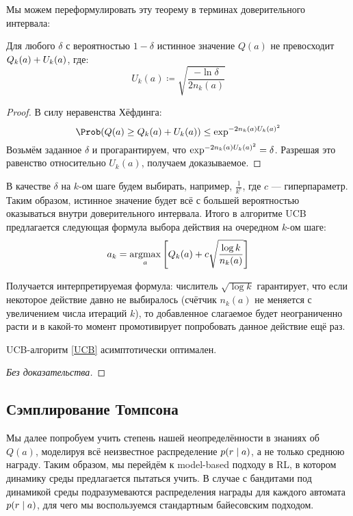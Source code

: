 Мы можем переформулировать эту теорему в терминах доверительного интервала:

\begin{proposition}
Для любого $\delta$ с вероятностью $1 - \delta$ истинное значение $Q(a)$ не превосходит $Q_k(a) \HM+ U_k(a)$, где:
$$U_k(a) \coloneqq \sqrt{\frac{-\ln \delta}{2n_k(a)}}$$
\begin{proof}
В силу неравенства Хёфдинга:
$$\Prob (Q(a) \ge Q_k(a) + U_k(a)) \le \exp^{-2 n_k(a) U_k(a)^2}$$
Возьмём заданное $\delta$ и прогарантируем, что $\exp^{-2 n_k(a) U_k(a)^2} \HM= \delta$. Разрешая это равенство относительно $U_k(a)$, получаем доказываемое.
\end{proof}
\end{proposition}

В качестве $\delta$ на $k$-ом шаге будем выбирать, например, $\frac{1}{k^c}$, где $c$ --- гиперпараметр. Таким образом, истинное значение будет всё с большей вероятностью оказываться внутри доверительного интервала. Итого в алгоритме UCB предлагается следующая формула выбора действия на очередном $k$-ом шаге:
\begin{equation}\label{UCB}
a_k = \mathop{\mathrm{argmax}}_a \left[ Q_k(a) + c \sqrt{\frac{\log k}{n_k(a)}} \right]
\end{equation}

Получается интерпретируемая формула: числитель $\sqrt{\log k}$ гарантирует, что если некоторое действие давно не выбиралось (счётчик $n_k(a)$ не меняется с увеличением числа итераций $k$), то добавленное слагаемое будет неограниченно расти и в какой-то момент промотивирует попробовать данное действие ещё раз.

\begin{theorem}
UCB-алгоритм \eqref{UCB} асимптотически оптимален.
\begin{proof}[Без доказательства]\end{proof}
\end{theorem}

\subsection{Сэмплирование Томпсона}

Мы далее попробуем учить степень нашей неопределённости в знаниях об $Q(a)$, моделируя всё неизвестное распределение $p(r \HM\mid a)$, а не только среднюю награду. Таким образом, мы перейдём к model-based подходу в RL, в котором динамику среды предлагается пытаться учить. В случае с бандитами под динамикой среды подразумеваются распределения награды для каждого автомата $p(r \HM\mid a)$, для чего мы воспользуемся стандартным байесовским подходом.

